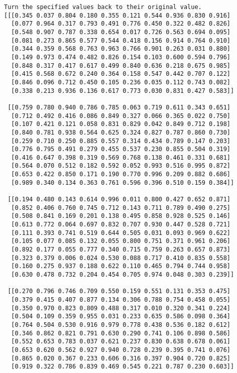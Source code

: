 \documentclass[11pt]{article}
\begin{document}
    \begin{Verbatim}[commandchars=\\\{\}]
Turn the specified values back to their original value.
[[[0.345 0.037 0.804 0.180 0.355 0.121 0.544 0.936 0.830 0.916]
  [0.077 0.964 0.317 0.793 0.491 0.776 0.450 0.322 0.482 0.826]
  [0.548 0.907 0.787 0.338 0.654 0.017 0.726 0.563 0.694 0.095]
  [0.081 0.273 0.865 0.577 0.544 0.418 0.156 0.914 0.764 0.910]
  [0.344 0.359 0.568 0.763 0.963 0.766 0.901 0.263 0.031 0.880]
  [0.149 0.973 0.474 0.482 0.826 0.154 0.103 0.600 0.594 0.796]
  [0.848 0.317 0.417 0.617 0.499 0.840 0.636 0.218 0.675 0.985]
  [0.415 0.568 0.672 0.240 0.364 0.158 0.547 0.442 0.707 0.122]
  [0.846 0.096 0.712 0.450 0.105 0.236 0.035 0.112 0.743 0.082]
  [0.338 0.213 0.936 0.136 0.617 0.773 0.030 0.831 0.427 0.583]]

 [[0.759 0.780 0.940 0.786 0.785 0.063 0.719 0.611 0.343 0.651]
  [0.712 0.492 0.416 0.086 0.849 0.327 0.066 0.365 0.022 0.750]
  [0.107 0.421 0.121 0.058 0.831 0.829 0.042 0.849 0.712 0.198]
  [0.840 0.781 0.938 0.564 0.625 0.324 0.827 0.787 0.860 0.730]
  [0.259 0.710 0.250 0.885 0.557 0.314 0.434 0.789 0.147 0.203]
  [0.776 0.795 0.491 0.279 0.455 0.537 0.230 0.855 0.504 0.319]
  [0.416 0.647 0.398 0.319 0.569 0.768 0.138 0.461 0.331 0.681]
  [0.564 0.070 0.512 0.182 0.592 0.052 0.993 0.516 0.995 0.872]
  [0.653 0.422 0.850 0.171 0.190 0.770 0.996 0.209 0.882 0.686]
  [0.989 0.340 0.134 0.363 0.761 0.596 0.396 0.510 0.159 0.384]]

 [[0.194 0.480 0.143 0.614 0.996 0.011 0.800 0.427 0.652 0.871]
  [0.852 0.406 0.760 0.745 0.712 0.143 0.711 0.789 0.490 0.275]
  [0.508 0.841 0.169 0.201 0.138 0.495 0.858 0.928 0.525 0.146]
  [0.613 0.772 0.064 0.697 0.832 0.707 0.930 0.447 0.528 0.721]
  [0.111 0.393 0.741 0.519 0.644 0.505 0.031 0.093 0.969 0.622]
  [0.105 0.077 0.085 0.132 0.055 0.800 0.751 0.371 0.961 0.206]
  [0.892 0.177 0.055 0.777 0.340 0.715 0.759 0.263 0.657 0.873]
  [0.323 0.379 0.006 0.024 0.530 0.088 0.717 0.410 0.835 0.558]
  [0.160 0.275 0.937 0.188 0.622 0.110 0.465 0.794 0.744 0.958]
  [0.630 0.478 0.732 0.204 0.454 0.705 0.974 0.048 0.303 0.239]]

 [[0.270 0.796 0.746 0.709 0.550 0.159 0.551 0.131 0.353 0.475]
  [0.379 0.415 0.407 0.877 0.134 0.306 0.788 0.754 0.458 0.055]
  [0.350 0.970 0.823 0.809 0.488 0.317 0.010 0.320 0.341 0.224]
  [0.504 0.109 0.359 0.955 0.031 0.233 0.635 0.586 0.098 0.364]
  [0.764 0.504 0.530 0.916 0.979 0.778 0.438 0.536 0.182 0.612]
  [0.346 0.862 0.821 0.791 0.630 0.290 0.741 0.106 0.898 0.586]
  [0.552 0.653 0.783 0.037 0.621 0.237 0.830 0.638 0.678 0.061]
  [0.653 0.620 0.562 0.927 0.940 0.728 0.239 0.395 0.741 0.076]
  [0.865 0.020 0.367 0.233 0.606 0.316 0.397 0.904 0.720 0.825]
  [0.919 0.322 0.786 0.839 0.469 0.545 0.221 0.787 0.230 0.603]]


\end{Verbatim}
\end{document}
